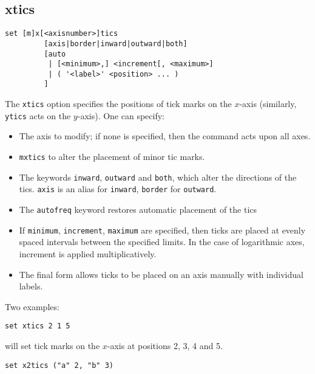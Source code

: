 \documentclass[a4paper,onecolumn,11pt]{book}
\begin{document}
\subsection{xtics}

\begin{verbatim}
set [m]x[<axisnumber>]tics 
         [axis|border|inward|outward|both] 
         [auto 
          | [<minimum>,] <increment[, <maximum>] 
          | ( '<label>' <position> ... ) 
         ] 
\end{verbatim}

The {\tt xtics} option specifies the positions of tick marks on the $x$-axis
(similarly, {\tt ytics} acts on the $y$-axis).  One can specify:

\begin{itemize}
\item The axis to modify; if none is specified, then the command acts upon all axes.

\item {\tt mxtics} to alter the placement of minor tic marks.

\item The keywords {\tt inward}, {\tt outward} and {\tt both}, which alter the
directions of the tics.  {\tt axis} is an alias for {\tt inward}, {\tt border}
for {\tt outward}.

\item The {\tt autofreq} keyword restores automatic placement of the tics

\item If {\tt minimum}, {\tt increment}, {\tt maximum} are specified, then ticks
are placed at evenly spaced intervals between the specified limits. In the case
of logarithmic axes, increment is applied multiplicatively. 

\item The final form allows ticks to be placed on an axis manually with
individual labels.
\end{itemize}
   
Two examples:

\begin{verbatim}
set xtics 2 1 5
\end{verbatim}

\noindent will set tick marks on the $x$-axis at positions 2, 3, 4 and 5.

\begin{verbatim}
set x2tics ("a" 2, "b" 3)
\end{verbatim}
\end{document}
